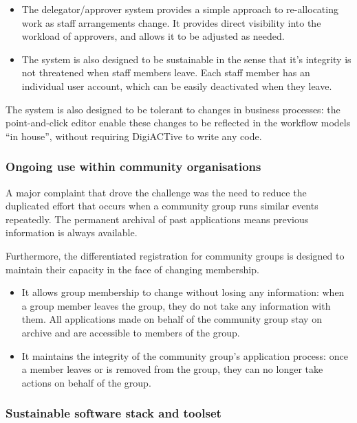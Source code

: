 \documentclass[12pt,a4paper,twosided]{article}
\begin{document}
\begin{itemize}

\item The delegator/approver system provides a simple approach to
  re-allocating work as staff arrangements change. It provides direct
  visibility into the workload of approvers, and allows it to be
  adjusted as needed.
\item
  The system is also designed to be sustainable in the sense that it's
  integrity is not threatened when staff members leave. Each staff
  member has an individual user account, which can be easily deactivated
  when they leave.
\end{itemize}

The system is also designed to be tolerant to changes in business
processes: the point-and-click editor enable these changes to be
reflected in the workflow models ``in house'', without requiring
DigiACTive to write any code.

\subsubsection{Ongoing use within community organisations}

A major complaint that drove the challenge was the need to reduce the
duplicated effort that occurs when a community group runs similar events
repeatedly. The permanent archival of past applications means previous
information is always available.

Furthermore, the differentiated registration for community groups is
designed to maintain their capacity in the face of changing membership.

\begin{itemize}

\item
  It allows group membership to change without losing any information:
  when a group member leaves the group, they do not take any information
  with them. All applications made on behalf of the community group stay
  on archive and are accessible to members of the group.
\item
  It maintains the integrity of the community group's application
  process: once a member leaves or is removed from the group, they can
  no longer take actions on behalf of the group.
\end{itemize}

\subsubsection{Sustainable software stack and toolset}
\end{document}
